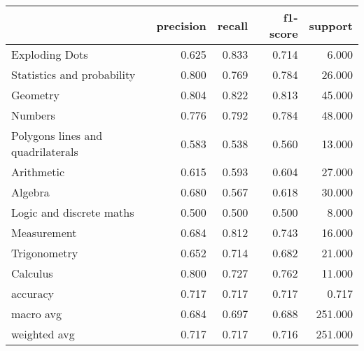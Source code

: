 \begin{tabular}{lrrrr}
\toprule
{} &  precision &  recall &  f1-score &  support \\
\midrule
Exploding Dots                    &      0.625 &   0.833 &     0.714 &    6.000 \\
Statistics and probability        &      0.800 &   0.769 &     0.784 &   26.000 \\
Geometry                          &      0.804 &   0.822 &     0.813 &   45.000 \\
Numbers                           &      0.776 &   0.792 &     0.784 &   48.000 \\
Polygons lines and quadrilaterals &      0.583 &   0.538 &     0.560 &   13.000 \\
Arithmetic                        &      0.615 &   0.593 &     0.604 &   27.000 \\
Algebra                           &      0.680 &   0.567 &     0.618 &   30.000 \\
Logic and discrete maths          &      0.500 &   0.500 &     0.500 &    8.000 \\
Measurement                       &      0.684 &   0.812 &     0.743 &   16.000 \\
Trigonometry                      &      0.652 &   0.714 &     0.682 &   21.000 \\
Calculus                          &      0.800 &   0.727 &     0.762 &   11.000 \\
accuracy                          &      0.717 &   0.717 &     0.717 &    0.717 \\
macro avg                         &      0.684 &   0.697 &     0.688 &  251.000 \\
weighted avg                      &      0.717 &   0.717 &     0.716 &  251.000 \\
\bottomrule
\end{tabular}
